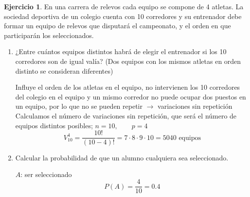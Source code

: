 \documentclass[a4paper, 12pt]{article}
\theoremstyle{definition}
\newtheorem{ej}{Ejercicio}
\begin{document}
\begin{ej}
En una carrera de relevos cada equipo se compone de 4 atletas. La sociedad deportiva de un colegio cuenta con 10 corredores y su entrenador debe formar un equipo de relevos que disputará el
campeonato, y el orden en que participarán los seleccionados.
\begin{enumerate}[label=\textit{\alph*)}]
\item ¿Entre cuántos equipos distintos habrá de elegir el entrenador si los 10 corredores son de
igual valía? (Dos equipos con los mismos atletas en orden distinto se consideran diferentes)

\medskip

Influye el orden de los atletas en el equipo, no intervienen los 10 corredores del colegio en el equipo y un mismo corredor no puede ocupar dos puestos en un equipo, por lo que no se pueden repetir $\longrightarrow$ variaciones sin repetición \\
Calculamos el número de variaciones sin repetición, que será el número de equipos distintos posibles; $n = 10,\qquad p = 4$
\[V^4_{10} = \frac{10!}{(10-4)!} = 7\cdot8\cdot9\cdot10 = 5040\text{  equipos}\]
\item Calcular la probabilidad de que un alumno cualquiera sea seleccionado.

\medskip

$A$: ser seleccionado
\[P(A) = \frac{4}{10} = 0.4\]

\end{enumerate}
\end{ej}

\medskip
\end{document}

